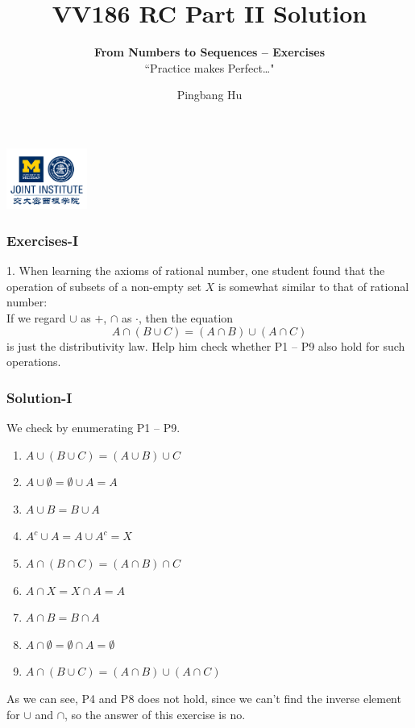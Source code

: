 \documentclass[12pt, t]{beamer}
\title{VV186 RC Part II Solution}
\subtitle{\textbf{From Numbers to Sequences -- Exercises}\\``Practice makes Perfect\dots"}
\institute[UM-SJTU JI]{University of Michigan-Shanghai Jiao Tong University Joint Institute}
\author{Pingbang Hu}
\renewcommand{\emph}[1]{{\color{Turquoise3}\textsl{#1}}}
\begin{document}
\begin{frame}
    \titlepage
    \begin{center}
        \includegraphics[height=2cm]{Figures/logo/logo2.png}
    \end{center}
\end{frame}

\begin{frame}
    \frametitle{Exercises-I}
    1. When learning the axioms of rational number, one student found that the operation of subsets of a non-empty
    set $X$ is somewhat similar to that of rational number:\\
    \vspace{1em}
    If we regard $\cup$ as $+$, $\cap$ as $\cdot$, then the equation
    \begin{equation*}
        A\cap(B\cup C)=(A\cap B)\cup(A\cap C)
    \end{equation*}
    is just the distributivity law. Help him  check whether P1 -- P9 also hold for such operations.
\end{frame}

\begin{frame}
    \frametitle{Solution-I}
    We check by enumerating P1 -- P9.
    \begin{enumerate}
        \item $A\cup(B\cup C) = (A\cup B)\cup C$
        \item $A\cup \emptyset =\emptyset \cup A=A$
        \item $A\cup B=B\cup A$
        \item \emph{$A^c\cup A=A\cup A^c=X$}
        \item $A\cap(B\cap C) = (A\cap B)\cap C$
        \item $A\cap X = X\cap A=A$
        \item $A\cap B=B\cap A $
        \item \emph{$A\cap \emptyset=\emptyset \cap A=\emptyset$}
        \item $A\cap (B\cup C)=(A\cap B)\cup (A\cap C)$
    \end{enumerate}
    As we can see, P4 and P8 does not hold, since we can't find the inverse element for $\cup$ and $\cap$, so the answer of this
    exercise is no.
\end{frame}
\end{document}
